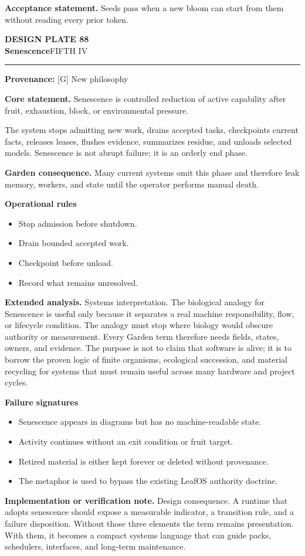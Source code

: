 \documentclass[10pt,letterpaper,oneside]{article}
\newcommand{\prov}[1]{\textcolor{gardenBlue}{\sffamily\footnotesize\textbf{Provenance:} #1}}
\newcommand{\platetitle}[3]{%
  \begin{minipage}[t][0.54in][t]{\textwidth}
  {\sffamily\bfseries\color{gardenDeep}\fontsize{9}{10}\selectfont DESIGN PLATE #1}\\[-1pt]
  {\sffamily\bfseries\color{gardenInk}\fontsize{16.5}{18}\selectfont #2}\hfill{\sffamily\color{gardenGreen}\large #3}
  \end{minipage}\vspace{-2pt}\hrule\vspace{5pt}}
\begin{document}
\begin{acceptbox}
\textbf{Acceptance statement.} Seeds pass when a new bloom can start from them without reading every prior token.
\end{acceptbox}
\newpage
\platetitle{88}{Senescence}{FIFTH IV}
\prov{[G] New philosophy}
\fontsize{8.85}{10.45}\selectfont
\begin{corebox}
\textbf{Core statement.} Senescence is controlled reduction of active capability after fruit, exhaustion, block, or environmental pressure.
\end{corebox}
The system stops admitting new work, drains accepted tasks, checkpoints current facts, releases leases, flushes evidence, summarizes residue, and unloads selected models. Senescence is not abrupt failure; it is an orderly end phase.

\textbf{Garden consequence.} Many current systems omit this phase and therefore leak memory, workers, and state until the operator performs manual death.

\textbf{Operational rules}
\begin{itemize}
\item Stop admission before shutdown.
\item Drain bounded accepted work.
\item Checkpoint before unload.
\item Record what remains unresolved.
\end{itemize}
\textbf{Extended analysis.} Systems interpretation. The biological analogy for Senescence is useful only because it separates a real machine responsibility, flow, or lifecycle condition. The analogy must stop where biology would obscure authority or measurement. Every Garden term therefore needs fields, states, owners, and evidence. The purpose is not to claim that software is alive; it is to borrow the proven logic of finite organisms, ecological succession, and material recycling for systems that must remain useful across many hardware and project cycles.

\textbf{Failure signatures}
\begin{itemize}
\item Senescence appears in diagrams but has no machine-readable state.
\item Activity continues without an exit condition or fruit target.
\item Retired material is either kept forever or deleted without provenance.
\item The metaphor is used to bypass the existing LeafOS authority doctrine.
\end{itemize}
\textbf{Implementation or verification note.} Design consequence. A runtime that adopts senescence should expose a measurable indicator, a transition rule, and a failure disposition. Without those three elements the term remains presentation. With them, it becomes a compact systems language that can guide packs, schedulers, interfaces, and long-term maintenance.
\end{document}
